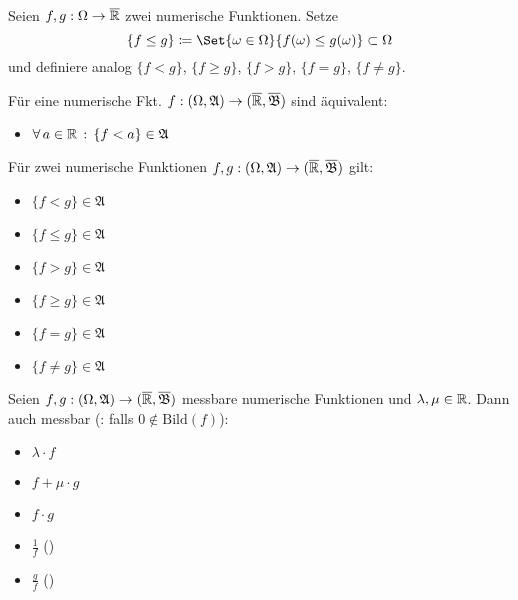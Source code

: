 \documentclass{cheat-sheet}
\newcommand{\ER}{\overline\R} %
\newcommand{\Alg}{\mathfrak{A}} %
\newcommand{\Bor}{\mathfrak{B}} %
\begin{document}
\begin{nota}
  Seien $f, g : \Omega \to \overline{\mathbb{R}}$ zwei numerische Funktionen. Setze
    \[ \{ f \leq g \} \coloneqq \Set{ \omega \in \Omega }{ f(\omega) \leq g(\omega) } \subset \Omega \]
  und definiere analog $\{ f < g \}$, $\{ f \geq g \}$, $\{ f > g \}$, $\{ f = g \}$, $\{ f \not= g \}$.
\end{nota}

\begin{satz}
  Für eine numerische Fkt. $f : (\Omega, \Alg) \to (\ER, \overline{\Bor})$ sind äquivalent:
  \begin{itemize}
    \miniitem{0.7 \linewidth}{$\forall \, a \in \R \,:\, \{ f \geq a \} = f^{-1}([a, \infty]) \in \Alg$}
    \item $\forall \, a \in \R \,:\, \{ f < a \} \in \Alg$
  \end{itemize}
\end{satz}

\begin{satz}
  Für zwei numerische Funktionen $f, g : (\Omega, \Alg) \to (\ER, \overline{\Bor})$ gilt:
  \begin{multicols}{3}
    \begin{itemize}
      \item $\{ f < g \} \in \Alg$
      \item $\{ f \leq g \} \in \Alg$
      \item $\{ f > g \} \in \Alg$
      \item $\{ f \geq g \} \in \Alg$
      \item $\{ f = g \} \in \Alg$
      \item $\{ f \not= g \} \in \Alg$
    \end{itemize}
  \end{multicols}
\end{satz}

\begin{satz}
  Seien $f, g : (\Omega, \Alg) \to (\ER, \overline{\Bor})$ messbare numerische Funktionen und $\lambda, \mu \in \mathbb{R}$. Dann auch messbar (\ddag: falls $0 \not\in \mathrm{Bild}(f)$):
  \begin{multicols}{5}
    \begin{itemize}
      \item $\lambda \cdot f$
      \item $f + \mu \cdot g$
      \item $f \cdot g$
      \item $\tfrac{1}{f}$ (\ddag)
      \item $\tfrac{g}{f}$ (\ddag)
    \end{itemize}
  \end{multicols}
\end{satz}
\end{document}
